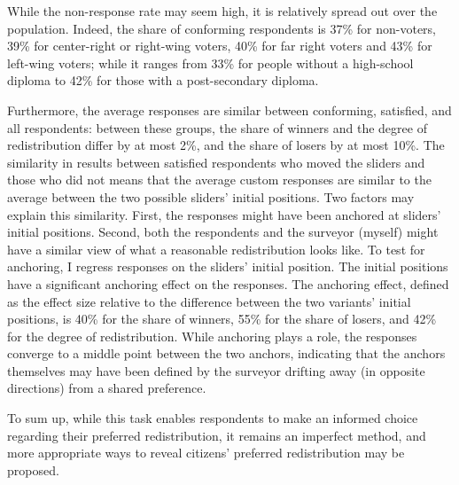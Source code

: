 \documentclass[12pt,english]{article}
\begin{document}
\begin{bibunit}
While the non-response rate may seem high, it is relatively spread out over the population. Indeed, the share of conforming respondents is 37\% for non-voters, 39\% for center-right or right-wing voters, 40\% for far right voters and 43\% for left-wing voters; while it ranges from 33\% for people without a %
high-school diploma to 42\% for those with a post-secondary diploma. 

Furthermore, the average responses are similar between conforming, satisfied, and all respondents: between these groups, the share of winners and the degree of redistribution differ by at most 2\%, and the share of losers by at most 10\%. The similarity in results between satisfied respondents who moved the sliders and those who did not means that the average custom responses are similar to the average between the two possible sliders' initial positions. Two factors may explain this similarity. First, the responses might have been anchored at sliders' initial positions. Second, both the respondents and the surveyor (myself) might have a similar view of what a reasonable redistribution looks like. To test for anchoring, I regress responses on the sliders' initial position. The initial positions have a significant anchoring effect on the responses. %
The anchoring effect, defined as the effect size relative to the difference between the two variants' initial positions, is 
40\% for the share of winners, 55\% for the share of losers, and 42\% for the degree of redistribution. While anchoring plays a role, the responses converge to a middle point between the two anchors, indicating that the anchors themselves may have been defined by the surveyor drifting away (in opposite directions) from a shared preference. %

To sum up, while this task enables respondents to make an informed choice regarding their preferred redistribution, it remains an imperfect method, and more appropriate ways to reveal citizens' preferred redistribution may be proposed. %


\end{bibunit}
\end{document}
